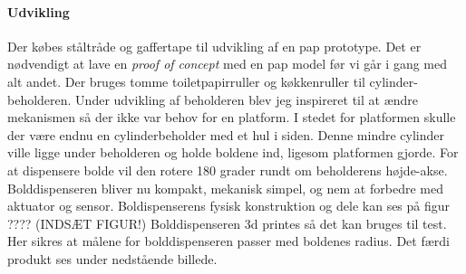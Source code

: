 \documentclass[Rapport/Rapport_main.tex]{subfiles}
\begin{document}
\paragraph{Udvikling}
\newline\newline
Der købes ståltråde og gaffertape til udvikling af en pap prototype. Det er nødvendigt at lave en \textit{proof of concept} med en pap model før vi går i gang med alt andet. Der bruges tomme toiletpapirruller og køkkenruller til cylinder-beholderen. Under udvikling af beholderen blev jeg inspireret til at ændre mekanismen så der ikke var behov for en platform. I stedet for platformen skulle der være endnu en cylinderbeholder med et hul i siden. Denne mindre cylinder ville ligge under beholderen og holde boldene ind, ligesom platformen gjorde. For at dispensere bolde vil den rotere 180 grader rundt om beholderens højde-akse. Bolddispenseren bliver nu kompakt, mekanisk simpel, og nem at forbedre med aktuator og sensor. Boldispenserens fysisk konstruktion og dele kan ses på figur ????
(INDSÆT FIGUR!)
Bolddispenseren 3d printes så det kan bruges til test. Her sikres at målene for bolddispenseren passer med boldenes radius. Det færdi produkt ses under nedstående billede.


\end{document}
